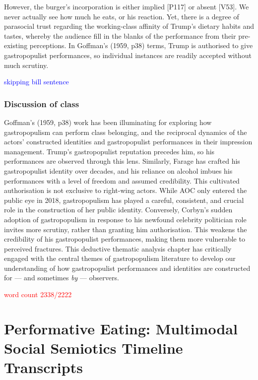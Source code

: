 \documentclass[a4paper, nobind]{templates/ociamthesis}
\begin{document}
However, the burger's incorporation is either implied {[}P117{]} or absent {[}V53{]}. We never actually see how much he eats, or his reaction. Yet, there is a degree of parasocial trust regarding the working-class affinity of Trump's dietary habits and tastes, whereby the audience fill in the blanks of the performance from their pre-existing perceptions. In Goffman's (1959, p38) terms, Trump is authorised to give gastropopulist performances, so individual instances are readily accepted without much scrutiny.

\textcolor{blue}{skipping bill sentence}

\hypertarget{discussion-of-class}{%
\subsection{Discussion of class}\label{discussion-of-class}}

Goffman's (1959, p38) work has been illuminating for exploring how gastropopulism can perform class belonging, and the reciprocal dynamics of the actors' constructed identities and gastropopulist performances in their impression management. Trump's gastropopulist reputation precedes him, so his performances are observed through this lens. Similarly, Farage has crafted his gastropopulist identity over decades, and his reliance on alcohol imbues his performances with a level of freedom and assumed credibility. This cultivated authorisation is not exclusive to right-wing actors. While AOC only entered the public eye in 2018, gastropopulism has played a careful, consistent, and crucial role in the construction of her public identity. Conversely, Corbyn's sudden adoption of gastropopulism in response to his newfound celebrity politician role invites more scrutiny, rather than granting him authorisation. This weakens the credibility of his gastropopulist performances, making them more vulnerable to perceived fractures. This deductive thematic analysis chapter has critically engaged with the central themes of gastropopulism literature to develop our understanding of how gastropopulist performances and identities are constructed for --- and sometimes \emph{by} --- observers.

\textcolor{red}{word count 2338/2222}

\hypertarget{performative-eating-multimodal-social-semiotics-timeline-transcripts}{%
\chapter{Performative Eating: Multimodal Social Semiotics Timeline Transcripts}\label{performative-eating-multimodal-social-semiotics-timeline-transcripts}}
\end{document}
